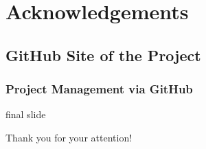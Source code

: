 \documentclass[cjk]{beamer}
\begin{document}
\section{Acknowledgements}
\subsection{GitHub Site of the Project}
\begin{frame}
  \frametitle{Project Management via GitHub}



\end{frame}
\begin{frame}
  \begin{beamercolorbox}[wd=\paperwidth, ht=1.4cm,rounded=true,shadow=true]{final slide}
    \begin{center}
      {\huge Thank you for your attention!}
    \end{center}
  \end{beamercolorbox}
\end{frame}
\end{document}
